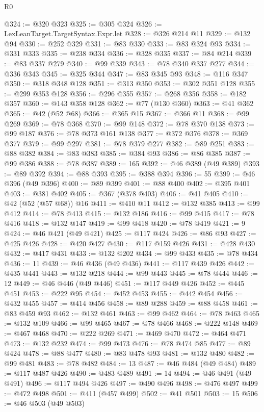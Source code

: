 \begin{lexlean}{R0}
\begin{coremodule}
@324 := @320 @323
@325 := @305 @324
@326 := LexLeanTarget.TargetSyntax.Expr.let
@328 := @326 @214 @11
@329 := @132 @94
@330 := @252 @329
@331 := @83 @330
@333 := @83 @324 @93
@334 := @331 @333
@335 := @238 @334
@336 := @328 @335
@337 := @84 @214
@339 := @83 @337 @279
@340 := @99 @339
@343 := @78 @340 @337 @277
@344 := @336 @343
@345 := @325 @344
@347 := @83 @345 @93
@348 := @116 @347
@350 := @318 @348 @128
@351 := @313 @350
@353 := @302 @351 @128
@355 := @299 @353 @128
@356 := @296 @355
@357 := @268 @356
@358 := @182 @357
@360 := @143 @358 @128
@362 := @77 (@130 @360)
@363 := @41 @362
@365 := @42 (@52 @68)
@366 := @365 @15
@367 := @366 @11
@368 := @99 @269
@369 := @78 @368
@370 := @99 @148
@372 := @78 @370 @138
@373 := @99 @187
@376 := @78 @373 @161 @138
@377 := @372 @376
@378 := @369 @377
@379 := @99 @297
@381 := @78 @379 @277
@382 := @89 @251
@383 := @88 @382
@384 := @83 @383
@385 := @384 @93
@386 := @86 @385
@387 := @99 @386
@388 := @78 @387
@389 := 165
@392 := @46 @389 (@49 @389)
@393 := @89 @392
@394 := @88 @393
@395 := @388 @394
@396 := 55
@399 := @46 @396 (@49 @396)
@400 := @89 @399
@401 := @88 @400
@402 := @395 @401
@403 := @381 @402
@405 := @367 (@378 @403)
@406 := @41 @405
@410 := @42 (@52 (@57 @68)) @16
@411 := @410 @11
@412 := @132 @385
@413 := @99 @412
@414 := @78 @413
@415 := @132 @186
@416 := @99 @415
@417 := @78 @416
@418 := @132 @147
@419 := @99 @418
@420 := @78 @419
@421 := 9
@424 := @46 @421 (@49 @421)
@425 := @117 @424
@426 := @86 @93
@427 := @425 @426
@428 := @420 @427
@430 := @117 @159 @426
@431 := @428 @430
@432 := @417 @431
@433 := @132 @202
@434 := @99 @433
@435 := @78 @434
@436 := 11
@439 := @46 @436 (@49 @436)
@441 := @117 @439 @426
@442 := @435 @441
@443 := @132 @218
@444 := @99 @443
@445 := @78 @444
@446 := 12
@449 := @46 @446 (@49 @446)
@451 := @117 @449 @426
@452 := @445 @451
@453 := @222 @95
@454 := @452 @453
@455 := @442 @454
@456 := @432 @455
@457 := @414 @456
@458 := @89 @288
@459 := @88 @458
@461 := @83 @459 @93
@462 := @132 @461
@463 := @99 @462
@464 := @78 @463
@465 := @132 @109
@466 := @99 @465
@467 := @78 @466
@468 := @222 @148
@469 := @467 @468
@470 := @222 @269
@471 := @469 @470
@472 := @464 @471
@473 := @132 @232
@474 := @99 @473
@476 := @78 @474 @85
@477 := @89 @424
@478 := @88 @477
@480 := @83 @478 @93
@481 := @132 @480
@482 := @99 @481
@483 := @78 @482
@484 := 13
@487 := @46 @484 (@49 @484)
@489 := @117 @487 @426
@490 := @483 @489
@491 := 14
@494 := @46 @491 (@49 @491)
@496 := @117 @494 @426
@497 := @490 @496
@498 := @476 @497
@499 := @472 @498
@501 := @411 (@457 @499)
@502 := @41 @501
@503 := 15
@506 := @46 @503 (@49 @503)

\end{coremodule}
\end{lexlean}
